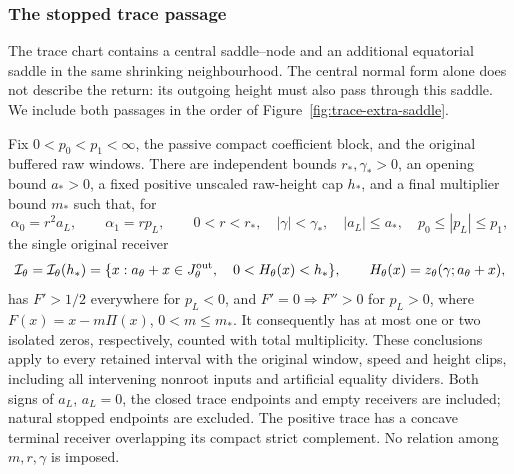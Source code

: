 \subsubsection{The stopped trace passage}
\label{subsec:trace-passage}

The trace chart contains a central saddle--node and an additional
equatorial saddle in the same shrinking neighbourhood. The central
normal form alone does not describe the return: its outgoing height
must also pass through this saddle. We include both passages in the
order of Figure~\ref{fig:trace-extra-saddle}.

\begin{proposition}
\label{deg:prop-stopped-trace}
Fix \(0<p_0<p_1<\infty\), the passive compact coefficient block,
and the original buffered raw windows. There are independent bounds
\(r_*,\gamma_*>0\), an opening bound \(a_*>0\), a fixed positive
unscaled raw-height cap \(h_*\), and a final multiplier bound \(m_*\)
such that, for
\[
 \alpha_0=r^2a_L,\qquad \alpha_1=rp_L,\qquad
 0<r<r_*,\quad |\gamma|<\gamma_*,\quad |a_L|\le a_*,\quad
 p_0\le|p_L|\le p_1,
\]
the single original receiver
\begin{equation}\label{deg:trace-actual-receiver}
 \mathcal I_\theta=\mathcal I_\theta(h_*)
 =\{x:a_\theta+x\in J_\theta^{\rm out},\quad
       0<H_\theta(x)<h_*\},\qquad H_\theta(x)=z_\theta(\gamma;a_\theta+x),
\end{equation}
has \(F'>1/2\) everywhere for \(p_L<0\), and
\(F'=0\Rightarrow F''>0\) for \(p_L>0\), where
\(F(x)=x-m\Pi(x)\), \(0<m\le m_*\).
It consequently has at most one or two isolated zeros, respectively,
counted with total multiplicity. These conclusions apply to every
retained interval with the original window, speed and height clips,
including all intervening nonroot inputs and artificial equality
dividers. Both signs of \(a_L\), \(a_L=0\), the closed trace endpoints
and empty receivers are included; natural stopped endpoints are excluded.
The positive trace has a concave terminal receiver overlapping its
compact strict complement. No relation among \(m,r,\gamma\) is imposed.
\end{proposition}



